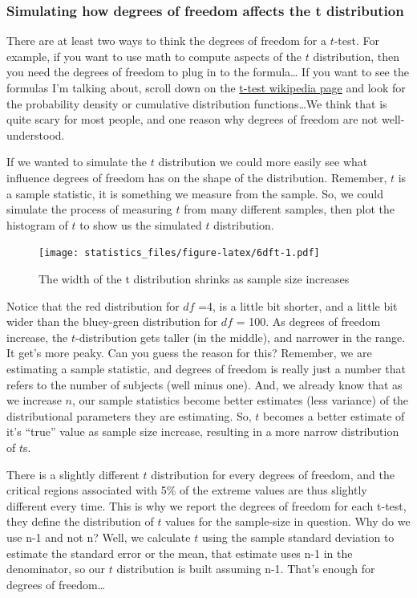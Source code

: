 \documentclass[]{book}
\begin{document}
\hypertarget{simulating-how-degrees-of-freedom-affects-the-t-distribution}{%
\subsubsection{Simulating how degrees of freedom affects the t distribution}\label{simulating-how-degrees-of-freedom-affects-the-t-distribution}}

There are at least two ways to think the degrees of freedom for a \(t\)-test. For example, if you want to use math to compute aspects of the \(t\) distribution, then you need the degrees of freedom to plug in to the formula\ldots{} If you want to see the formulas I'm talking about, scroll down on the \href{https://en.wikipedia.org/wiki/Student\%27s_t-distribution}{t-test wikipedia page} and look for the probability density or cumulative distribution functions\ldots{}We think that is quite scary for most people, and one reason why degrees of freedom are not well-understood.

If we wanted to simulate the \(t\) distribution we could more easily see what influence degrees of freedom has on the shape of the distribution. Remember, \(t\) is a sample statistic, it is something we measure from the sample. So, we could simulate the process of measuring \(t\) from many different samples, then plot the histogram of \(t\) to show us the simulated \(t\) distribution.

\begin{figure}
\centering
\texttt{[image: statistics\_files/figure-latex/6dft-1.pdf]}
\caption{\label{fig:6dft}The width of the t distribution shrinks as sample size increases}
\end{figure}

Notice that the red distribution for \(df\) =4, is a little bit shorter, and a little bit wider than the bluey-green distribution for \(df\) = 100. As degrees of freedom increase, the \(t\)-distribution gets taller (in the middle), and narrower in the range. It get's more peaky. Can you guess the reason for this? Remember, we are estimating a sample statistic, and degrees of freedom is really just a number that refers to the number of subjects (well minus one). And, we already know that as we increase \(n\), our sample statistics become better estimates (less variance) of the distributional parameters they are estimating. So, \(t\) becomes a better estimate of it's ``true'' value as sample size increase, resulting in a more narrow distribution of \(t\)s.

There is a slightly different \(t\) distribution for every degrees of freedom, and the critical regions associated with 5\% of the extreme values are thus slightly different every time. This is why we report the degrees of freedom for each t-test, they define the distribution of \(t\) values for the sample-size in question. Why do we use n-1 and not n? Well, we calculate \(t\) using the sample standard deviation to estimate the standard error or the mean, that estimate uses n-1 in the denominator, so our \(t\) distribution is built assuming n-1. That's enough for degrees of freedom\ldots{}
\end{document}
